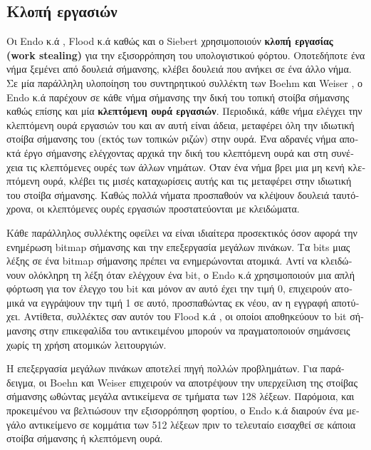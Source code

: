 \begin{greek}
\subsection{Κλοπή εργασιών}
Οι Endo κ.ά \cite{DBLP:conf/sc/EndoTY97}, Flood κ.ά \cite{DBLP:conf/jvm/FloodDSZ01}
καθώς και ο Siebert \cite{DBLP:conf/iwmm/Siebert10} χρησιμοποιούν 
\textbf{κλοπή εργασίας (work stealing)} για την εξισορρόπηση
του υπολογιστικού φόρτου. Οποτεδήποτε ένα νήμα ξεμένει από
δουλειά σήμανσης, κλέβει δουλειά που ανήκει σε ένα άλλο νήμα.
Σε μία παράλληλη υλοποίηση του συντηρητικού συλλέκτη των Boehm
και Weiser \cite{DBLP:journals/spe/BoehmW88}, ο Endo κ.ά παρέχουν
σε κάθε νήμα σήμανσης την δική του τοπική στοίβα σήμανσης καθώς
επίσης και μία \textbf{κλεπτόμενη ουρά εργασιών}. Περιοδικά,
κάθε νήμα ελέγχει την κλεπτόμενη ουρά εργασιών του και αν αυτή
είναι άδεια, μεταφέρει όλη την ιδιωτική στοίβα σήμανσης του (εκτός
των τοπικών ριζών) στην ουρά. Ένα αδρανές νήμα αποκτά έργο σήμανσης
ελέγχοντας αρχικά την δική του κλεπτόμενη ουρά και στη συνέχεια
τις κλεπτόμενες ουρές των άλλων νημάτων. Όταν ένα νήμα βρει μια
μη κενή κλεπτόμενη ουρά, κλέβει τις μισές καταχωρίσεις αυτής
και τις μεταφέρει στην ιδιωτική του στοίβα σήμανσης. Καθώς πολλά
νήματα προσπαθούν να κλέψουν δουλειά ταυτόχρονα, οι κλεπτόμενες
ουρές εργασιών προστατεύονται με κλειδώματα. 

Κάθε παράλληλος συλλέκτης οφείλει να είναι ιδιαίτερα προσεκτικός
όσον αφορά την ενημέρωση bitmap σήμανσης και την επεξεργασία
μεγάλων πινάκων. Τα bits μιας λέξης σε ένα bitmap σήμανσης πρέπει
να ενημερώνονται ατομικά. Αντί να κλειδώνουν ολόκληρη τη λέξη
όταν ελέγχουν ένα bit, ο Endo κ.ά χρησιμοποιούν μια απλή φόρτωση
για τον έλεγχο του bit και μόνον αν αυτό έχει την τιμή 0, επιχειρούν
ατομικά να εγγράψουν την τιμή 1 σε αυτό, προσπαθώντας εκ νέου,
αν η εγγραφή αποτύχει. Αντίθετα, συλλέκτες σαν αυτόν του Flood
κ.ά \cite{DBLP:conf/jvm/FloodDSZ01}, οι οποίοι αποθηκεύουν το
bit σήμανσης στην επικεφαλίδα του αντικειμένου μπορούν να
πραγματοποιούν σημάνσεις χωρίς τη χρήση ατομικών λειτουργιών.

Η επεξεργασία μεγάλων πινάκων αποτελεί πηγή πολλών προβλημάτων.
Για παράδειγμα, οι Boehn και Weiser \cite{DBLP:journals/spe/BoehmW88}
επιχειρούν να αποτρέψουν την υπερχείλιση της στοίβας σήμανσης
ωθώντας μεγάλα αντικείμενα σε τμήματα των 128 λέξεων. Παρόμοια,
και προκειμένου να βελτιώσουν την εξισορρόπηση φορτίου, ο Endo
κ.ά διαιρούν ένα μεγάλο αντικείμενο σε κομμάτια των 512 λέξεων 
πριν το τελευταίο εισαχθεί σε κάποια στοίβα σήμανσης ή κλεπτόμενη 
ουρά.


\end{greek}
